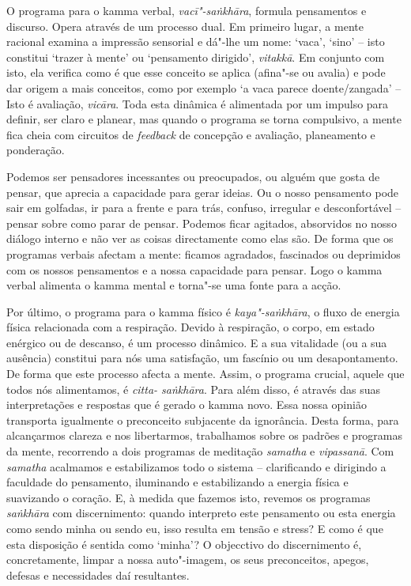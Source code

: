 O programa para o kamma verbal, \emph{vacī"-saṅkhāra}, formula pensamentos e
discurso. Opera através de um processo dual. Em primeiro lugar, a mente racional
examina a impressão sensorial e dá"-lhe um nome: `vaca', `sino' -- isto constitui
`trazer à mente' ou `pensamento dirigido', \emph{vitakkā}. Em conjunto com isto,
ela verifica como é que esse conceito se aplica (afina"-se ou avalia) e pode dar
origem a mais conceitos, como por exemplo `a vaca parece doente/zangada' -- Isto
é avaliação, \emph{vicāra}. Toda esta dinâmica é alimentada por um impulso para
definir, ser claro e planear, mas quando o programa se torna compulsivo, a mente
fica cheia com circuitos de \emph{feedback} de concepção e avaliação,
planeamento e ponderação.

Podemos ser pensadores incessantes ou preocupados, ou alguém que gosta de
pensar, que aprecia a capacidade para gerar ideias. Ou o nosso pensamento pode
sair em golfadas, ir para a frente e para trás, confuso, irregular e
desconfortável -- pensar sobre como parar de pensar. Podemos ficar agitados,
absorvidos no nosso diálogo interno e não ver as coisas directamente como elas
são. De forma que os programas verbais afectam a mente: ficamos agradados,
fascinados ou deprimidos com os nossos pensamentos e a nossa capacidade para
pensar. Logo o kamma verbal alimenta o kamma mental e torna"-se uma fonte para a
acção.

Por último, o programa para o kamma físico é \emph{kaya"-saṅkhāra}, o fluxo de
energia física relacionada com a respiração. Devido à respiração, o corpo, em
estado enérgico ou de descanso, é um processo dinâmico. E a sua vitalidade (ou a
sua ausência) constitui para nós uma satisfação, um fascínio ou um
desapontamento. De forma que este processo afecta a mente. Assim, o programa
crucial, aquele que todos nós alimentamos, é \emph{citta- saṅkhāra}. Para além
disso, é através das suas interpretações e respostas que é gerado o kamma novo.
Essa nossa opinião transporta igualmente o preconceito subjacente da ignorância.
Desta forma, para alcançarmos clareza e nos libertarmos, trabalhamos sobre os
padrões e programas da mente, recorrendo a dois programas de meditação
\emph{samatha} e \emph{vipassanā}. Com \emph{samatha} acalmamos e estabilizamos
todo o sistema -- clarificando e dirigindo a faculdade do pensamento, iluminando
e estabilizando a energia física e suavizando o coração. E, à medida que fazemos
isto, revemos os programas \emph{saṅkhāra} com discernimento: quando interpreto
este pensamento ou esta energia como sendo minha ou sendo eu, isso resulta em
tensão e stress? E como é que esta disposição é sentida como `minha'? O
objecctivo do discernimento é, concretamente, limpar a nossa auto"-imagem, os
seus preconceitos, apegos, defesas e necessidades daí resultantes.

